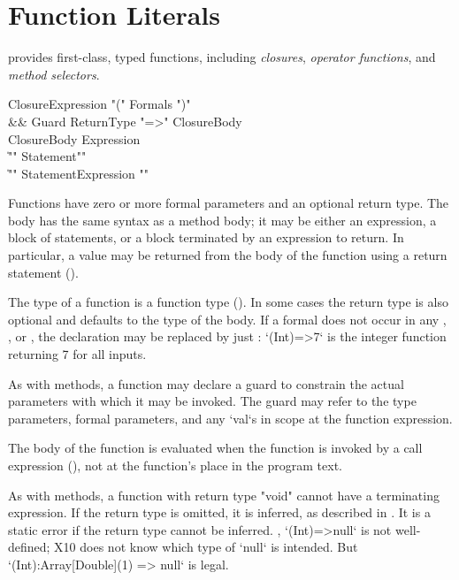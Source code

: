 \section{Function Literals}
\label{FunctionLiteral}

\Xten{} provides first-class, typed functions, including
\emph{closures}, \emph{operator functions}, and \emph{method
  selectors}.

\begin{grammar}
ClosureExpression \:
        \xcd"("
        Formals\opt
        \xcd")"
\\ &&
        Guard\opt
        ReturnType\opt
        \xcd"=>" ClosureBody \\
ClosureBody \:
        Expression \\
        \| \xcd"{" Statement\star \xcd"}" \\
        \| \xcd"{" Statement\star Expression \xcd"}" \\
\end{grammar}

Functions have zero or more formal parameters and an optional return type.
The body has the 
same syntax as a method body; it may be either an expression, a block
of statements, or a block terminated by an expression to return. In
particular, a value may be returned from the body of the function
using a return statement (). 

The type of a
function is a function type ().  In some cases the
return type  is also optional and defaults to the type of the
body. If a formal  does not occur in any
, ,  or , the declaration  may
be replaced by just : \xcd`(Int)=>7` is the integer function returning
7 for all inputs.

\label{ClosureGuard}

As with methods, a function may declare a guard to
constrain the actual parameters with which it may be invoked.
The guard may refer to the type parameters, formal parameters,
and any \xcd`val`s in scope at the function expression.

The body of the function is evaluated when the function is
invoked by a call expression (), not at the function's
place in the program text.

As with methods, a function with return type \xcd"void" cannot
have a terminating expression. 
If the return type is omitted, it is inferred, as described in
.
It is a static error if the return type cannot be inferred.  \Eg,
\xcd`(Int)=>null` is not well-defined; X10 does not know which type of
\xcd`null` is intended.  
But \xcd`(Int):Array[Double](1) => null` is legal.


